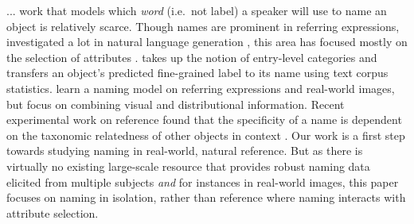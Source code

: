 ... work that models which \textit{word} (i.e.\ not label) a speaker will use to name an object is relatively scarce.
Though names are prominent in referring expressions, investigated a lot in natural language generation \cite{dale:1995}, this area has focused mostly on the selection of attributes %
\cite{krahmer:2012}. 
 takes up the notion of entry-level categories \cite{rosch1976basic} and transfers an object's predicted fine-grained label to its name using text corpus statistics.
  learn a naming model on referring expressions and real-world images, but focus on combining visual and distributional information. 
 Recent experimental work on reference found that the specificity of a name is dependent on the taxonomic relatedness of other objects in context
\cite{rohde2012communicating,graf2016animal}. Our work is a first step towards studying naming in real-world, natural reference.
But as there is virtually no existing large-scale resource that provides robust naming data elicited from multiple subjects \textit{and} for instances in real-world images, this paper focuses on naming in isolation, rather than reference where naming interacts with attribute selection.

